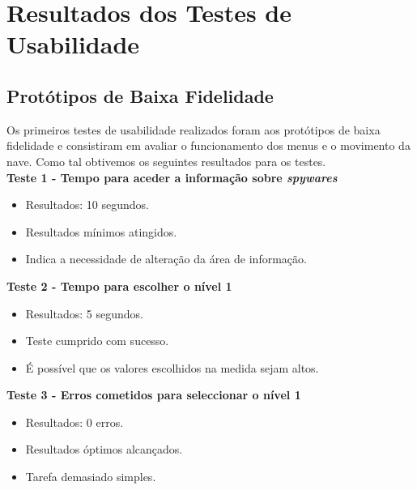 \chapter{Resultados dos Testes de Usabilidade}
\label{chap:results} 
\section{Protótipos de Baixa Fidelidade}
Os primeiros testes de usabilidade realizados foram aos protótipos de baixa fidelidade e consistiram em avaliar o funcionamento dos menus e o movimento da nave. Como tal obtivemos os seguintes resultados para os testes.\\

\textbf{Teste 1 - Tempo para aceder a informação sobre \textit{spywares}}

\begin{itemize}

\item Resultados: 10 segundos.

\item Resultados mínimos atingidos.

\item Indica a necessidade de alteração da área de informação. 
\end{itemize}

\textbf{Teste 2 - Tempo para escolher o nível 1}

\begin{itemize}

\item Resultados: 5 segundos.

\item Teste cumprido com sucesso.

\item É possível que os valores escolhidos na medida sejam altos.
\end{itemize}

\textbf{Teste 3 - Erros cometidos para seleccionar o nível 1}

\begin{itemize}

\item Resultados: 0 erros.

\item Resultados óptimos alcançados.

\item Tarefa demasiado simples.
\end{itemize}

